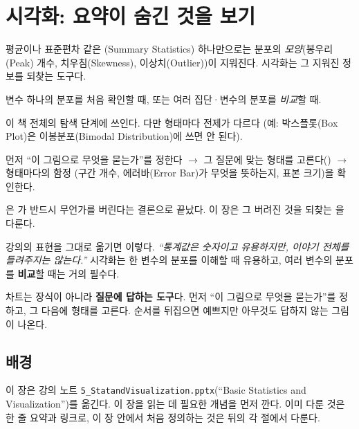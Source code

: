 \chapter{시각화: 요약이 숨긴 것을 보기}
\label{ch:visualization}

\begin{inbrief}
  \item[Why] 평균이나 표준편차 같은 (Summary Statistics) 하나만으로는
             분포의 \emph{모양}(봉우리(Peak) 개수, 치우침(Skewness),
             이상치(Outlier))이 지워진다. 시각화는 그 지워진 정보를 되찾는 도구다.
  \item[When] 변수 하나의 분포를 처음 확인할 때, 또는 여러 집단·변수의 분포를
              \emph{비교}할 때.
  \item[Where] 이 책 전체의 탐색 단계에 쓰인다. 다만 형태마다 전제가 다르다
               (예: 박스플롯(Box Plot)은 이봉분포(Bimodal Distribution)에 쓰면
               안 된다).
  \item[How] 먼저 ``이 그림으로 무엇을 묻는가''를 정한다 $\to$ 그 질문에 맞는
             형태를 고른다() $\to$ 형태마다의 함정
             (구간 개수, 에러바(Error Bar)가 무엇을 뜻하는지, 표본 크기)을
             확인한다.
\end{inbrief}

은 가 반드시 무언가를 버린다는 결론으로
끝났다. 이 장은 그 버려진 것을 되찾는 을 다룬다.

강의의 표현을 그대로 옮기면 이렇다. \emph{``통계값은 숫자이고 유용하지만, 이야기
전체를 들려주지는 않는다.''} 시각화는 한 변수의 분포를 이해할 때 유용하고,
여러 변수의 분포를 \textbf{비교}할 때는 거의 필수다.

\begin{keyidea}
차트는 장식이 아니라 \textbf{질문에 답하는 도구}다. 먼저 ``이 그림으로 무엇을
묻는가''를 정하고, 그 다음에 형태를 고른다. 순서를 뒤집으면 예쁘지만 아무것도
답하지 않는 그림이 나온다.
\end{keyidea}

\section{배경}
\label{sec:vis-background}

이 장은 강의 노트 \texttt{5\_StatandVisualization.pptx}(``Basic Statistics and
Visualization'')를 옮긴다. 이 장을 읽는 데 필요한 개념을 먼저 깐다. 이미
다룬 것은 한 줄 요약과 링크로, 이 장 안에서 처음 정의하는 것은 뒤의 각 절에서
다룬다.

